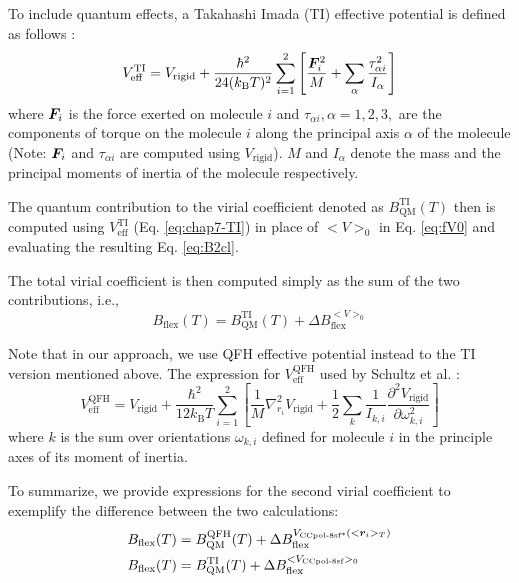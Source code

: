             To include quantum effects, a Takahashi Imada (TI) \cite{Takahashi1984} effective potential is defined as follows \cite{Schenter2002,Jankowski2015}:
            \begin{equation}
            \label{eq:chap7-TI}
                V^\text{TI}_\text{eff} = V_{\text{rigid}} + \displaystyle\frac{\hbar^2}{24 (k_\text{B} T)^2} \sum_{i = 1}^2 \left[ \frac{{\boldsymbol {F}}_i^2}{M} + \sum_\alpha \frac{\tau_{\alpha i}^2}{I_\alpha} \right]
            \end{equation}
            where ${\boldsymbol {F}}_i$ is the force exerted on molecule $i$ and $\tau_{\alpha i}, \alpha = 1, 2, 3,$ are the components of torque on the molecule $i$ along the principal axis $\alpha$ of the molecule (Note: ${\boldsymbol {F}}_i$ and $\tau_{\alpha i}$ are computed using $V_{\text{rigid}}$). $M$ and $I_\alpha$ denote the mass and the principal moments of inertia of the molecule respectively.

            The quantum contribution to the virial coefficient denoted as $B_\text{QM}^\text{TI} (T)$ then is computed using $V^\text{TI}_\text{eff}$ (Eq. \eqref{eq:chap7-TI}) in place of $<V>_0$ in Eq. \eqref{eq:fV0} and evaluating the resulting Eq. \eqref{eq:B2cl}.

            The total virial coefficient is then computed simply as the sum of the two contributions, i.e.,
            \begin{equation}
                 B_\text{flex} (T) = B_\text{QM}^\text{TI} (T) + \Delta B_\text{flex}^{<V>_0}
            \end{equation}

            Note that in our approach, we use QFH effective potential instead to the TI version mentioned above. The expression for $V^\text{QFH}_\text{eff}$ used by Schultz et al. \cite{Schultz2015,Feynman}:
            \begin{equation}
                \label{eq:chap7-QFH}
                V^\text{QFH}_\text{eff} = V_{\text{rigid}} + \displaystyle\frac{\hbar^2}{12 k_\text{B} T} \sum_{i = 1}^2 \left[ \frac{1}{M} \nabla^2_{r_i} V_\text{rigid} + \frac{1}{2} \sum_k \frac{1}{I_{k,i}} \frac{\partial^2 V_\text{rigid}}{\partial \omega_{k,i}^2} \right]
            \end{equation}
            where $k$ is the sum over orientations $\omega_{k,i}$ defined for molecule $i$ in the principle axes of its moment of inertia.

            To summarize, we provide expressions for the second virial coefficient to exemplify the difference between the two calculations:
            \begin{subequations}
                \label{eq:B2Total}
                \begin{align}
                    B_\text{flex} (T) &= B_\text{QM}^\text{QFH} (T) + \Delta B_\text{flex}^{V_\text{CCpol-8sf*}(<{\boldsymbol {r}}_i>_T)}\label{eq:b2ccpol8sf*}\\
                    B_\text{flex} (T) &= B_\text{QM}^\text{TI} (T) + \Delta B_\text{flex}^{<V_\text{CCpol-8sf}>_0}
                \end{align}
            \end{subequations}
